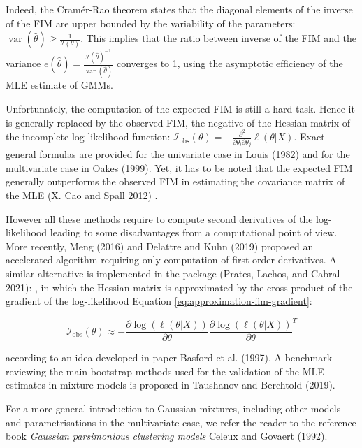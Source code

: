 Indeed, the Cramér-Rao theorem states that the diagonal elements of the
inverse of the FIM are upper bounded by the variability of the
parameters:
\(\operatorname{var}(\hat{\theta}) \ge \frac{1}{\mathcal{I}(\theta)}\). This
implies that the ratio between inverse of the FIM and the variance
\(e(\hat{\theta})=\frac{\mathcal{I}(\hat{\theta})^{-1}}{\operatorname{var}(\hat{\theta})}\)
converges to 1, using the asymptotic efficiency of the MLE estimate of
GMMs.

Unfortunately, the computation of the expected FIM is still a hard task.
Hence it is generally replaced by the observed FIM, the negative of the
Hessian matrix of the incomplete log-likelihood function:
\(\mathcal{I}_\text{obs}(\theta)= -\frac{\partial^2}{\partial \theta_i \partial \theta_j} \ell(\theta|X)\).
Exact general formulas are provided for the univariate case in Louis (1982)
and for the multivariate case in Oakes (1999). Yet, it has to be noted that
the expected FIM generally outperforms the observed FIM in estimating
the covariance matrix of the MLE (X. Cao and Spall 2012) .

However all these methods require to compute second derivatives of the
log-likelihood leading to some disadvantages from a computational point
of view. More recently, Meng (2016) and Delattre and Kuhn (2019) proposed an
accelerated algorithm requiring only computation of first order
derivatives. A similar alternative is implemented in the
 package (Prates, Lachos, and Cabral 2021):
, in which the Hessian matrix is approximated by the cross-product of the
gradient of the log-likelihood Equation
\eqref{eq:approximation-fim-gradient}:

\begin{equation}
        \mathcal{I}_{\text{obs}}(\theta) \approx - \frac{\partial \log (\ell (\theta|X))}{\partial \theta} \frac{\partial \log (\ell (\theta|X))}{\partial \theta}^T
    \label{eq:aproximation-fim-gradient}
\end{equation}

according to an idea developed in paper Basford et al. (1997). A benchmark
reviewing the main bootstrap methods used for the validation of the MLE
estimates in mixture models is proposed in Taushanov and Berchtold (2019).

For a more general introduction to Gaussian mixtures, including other
models and parametrisations in the multivariate case, we refer the
reader to the reference book \emph{Gaussian parsimonious clustering models}
Celeux and Govaert (1992).

